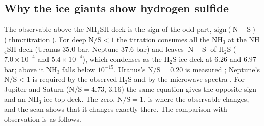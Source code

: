 \documentclass[11pt]{article}
\theoremstyle{definition}\newtheorem{definition}[theorem]{Definition}
\theoremstyle{remark}\newtheorem{remark}[theorem]{Remark}
\begin{document}
\subsection{Why the ice giants show hydrogen sulfide}\label{sec:resolved}
The observable above the NH$_4$SH deck is the sign of the odd part, $\mathrm{sign}(\mathrm N-\mathrm S)$ (\cref{thm:titration}). For deep $\mathrm N/\mathrm S<1$ the titration consumes all the NH$_3$ at the NH$_4$SH deck (Uranus $35.0$ bar, Neptune $37.6$ bar) and leaves $|\mathrm N-\mathrm S|$ of H$_2$S ($7.0\times10^{-4}$ and $5.4\times10^{-4}$), which condenses as the H$_2$S ice deck at $6.26$ and $6.97$ bar; above it NH$_3$ falls below $10^{-15}$. Uranus's $\mathrm N/\mathrm S=0.20$ is measured \cite{Molter2021}; Neptune's $\mathrm N/\mathrm S<1$ is required by the observed H$_2$S \cite{Irwin2019a} and by the microwave spectra \cite{dePater1991}. For Jupiter and Saturn ($\mathrm N/\mathrm S=4.73$, $3.16$) the same equation gives the opposite sign and an NH$_3$ ice top deck. The zero, $\mathrm N/\mathrm S=1$, is where the observable changes, and the scan shows that it changes exactly there. The comparison with observation is as follows.
\end{document}
